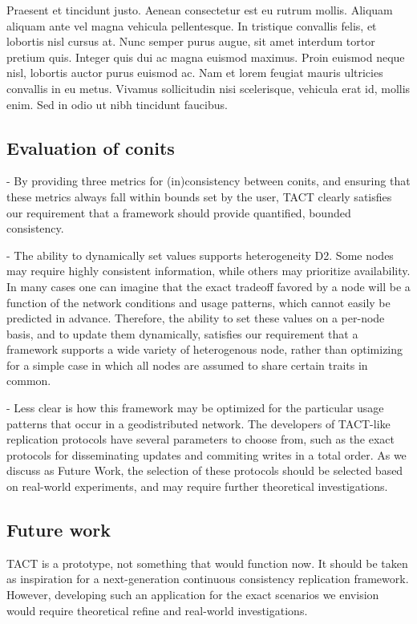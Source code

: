 Praesent et tincidunt justo. Aenean consectetur est eu rutrum
mollis. Aliquam aliquam ante vel magna vehicula pellentesque. In
tristique convallis felis, et lobortis nisl cursus at. Nunc semper
purus augue, sit amet interdum tortor pretium quis. Integer quis dui
ac magna euismod maximus. Proin euismod neque nisl, lobortis auctor
purus euismod ac. Nam et lorem feugiat mauris ultricies convallis in
eu metus. Vivamus sollicitudin nisi scelerisque, vehicula erat id,
mollis enim. Sed in odio ut nibh tincidunt faucibus.

\subsection{Evaluation of conits}

- By providing three metrics for (in)consistency between conits, and
  ensuring that these metrics always fall within bounds set by the
  user, TACT clearly satisfies our requirement that a framework should
  provide quantified, bounded consistency.

- The ability to dynamically set values supports heterogeneity
  D2. Some nodes may require highly consistent information, while
  others may prioritize availability. In many cases one can imagine
  that the exact tradeoff favored by a node will be a function of the
  network conditions and usage patterns, which cannot easily be
  predicted in advance. Therefore, the ability to set these values on
  a per-node basis, and to update them dynamically, satisfies our
  requirement that a framework supports a wide variety of heterogenous
  node, rather than optimizing for a simple case in which all nodes
  are assumed to share certain traits in common.

- Less clear is how this framework may be optimized for the particular
  usage patterns that occur in a geodistributed network. The
  developers of TACT-like replication protocols have several
  parameters to choose from, such as the exact protocols for
  disseminating updates and commiting writes in a total order. As we
  discuss as Future Work, the selection of these protocols should be
  selected based on real-world experiments, and may require further
  theoretical investigations.

\subsection{Future work}

TACT is a prototype, not something that would function now. It should
be taken as inspiration for a next-generation continuous consistency
replication framework. However, developing such an application for the
exact scenarios we envision would require theoretical refine and
real-world investigations.

